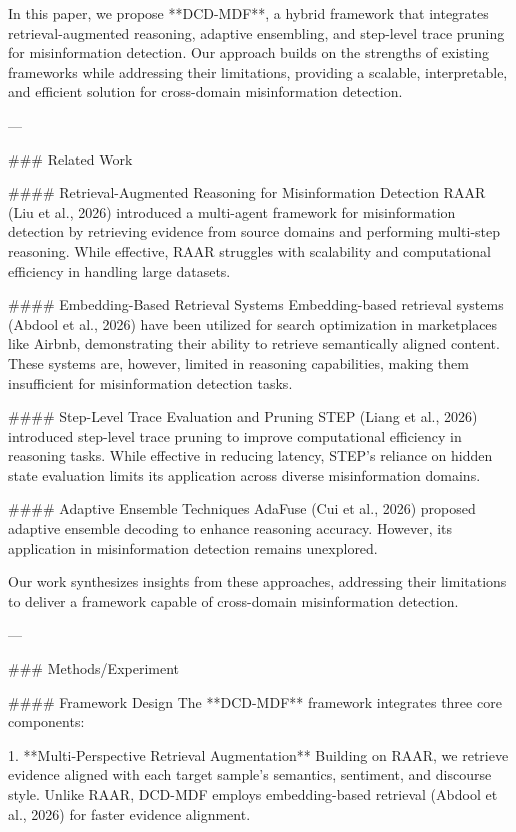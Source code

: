In this paper, we propose **DCD-MDF**, a hybrid framework that integrates retrieval-augmented reasoning, adaptive ensembling, and step-level trace pruning for misinformation detection. Our approach builds on the strengths of existing frameworks while addressing their limitations, providing a scalable, interpretable, and efficient solution for cross-domain misinformation detection.

---

### Related Work

#### Retrieval-Augmented Reasoning for Misinformation Detection
RAAR (Liu et al., 2026) introduced a multi-agent framework for misinformation detection by retrieving evidence from source domains and performing multi-step reasoning. While effective, RAAR struggles with scalability and computational efficiency in handling large datasets.

#### Embedding-Based Retrieval Systems
Embedding-based retrieval systems (Abdool et al., 2026) have been utilized for search optimization in marketplaces like Airbnb, demonstrating their ability to retrieve semantically aligned content. These systems are, however, limited in reasoning capabilities, making them insufficient for misinformation detection tasks.

#### Step-Level Trace Evaluation and Pruning
STEP (Liang et al., 2026) introduced step-level trace pruning to improve computational efficiency in reasoning tasks. While effective in reducing latency, STEP's reliance on hidden state evaluation limits its application across diverse misinformation domains.

#### Adaptive Ensemble Techniques
AdaFuse (Cui et al., 2026) proposed adaptive ensemble decoding to enhance reasoning accuracy. However, its application in misinformation detection remains unexplored.

Our work synthesizes insights from these approaches, addressing their limitations to deliver a framework capable of cross-domain misinformation detection.

---

### Methods/Experiment

#### Framework Design
The **DCD-MDF** framework integrates three core components:

1. **Multi-Perspective Retrieval Augmentation**  
   Building on RAAR, we retrieve evidence aligned with each target sample's semantics, sentiment, and discourse style. Unlike RAAR, DCD-MDF employs embedding-based retrieval (Abdool et al., 2026) for faster evidence alignment.

